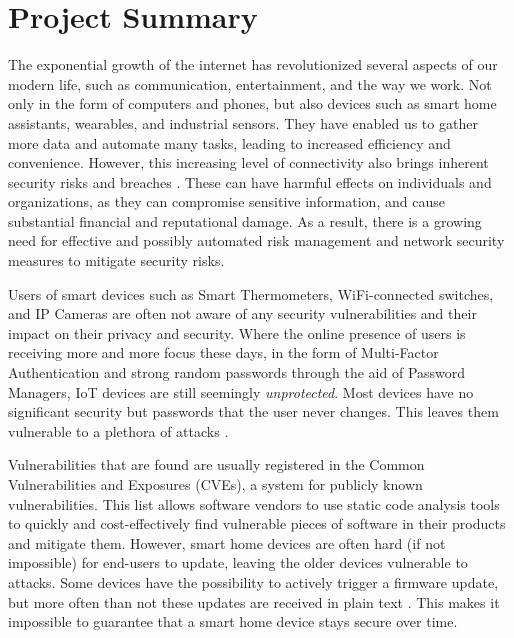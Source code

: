 \section{Project Summary}\label{sec:project-summary}

The exponential growth of the internet has revolutionized several aspects of our modern life, such as communication, entertainment, and the way we work. Not only in the form of computers and phones, but also devices such as smart home assistants, wearables, and industrial sensors. They have enabled us to gather more data and automate many tasks, leading to increased efficiency and convenience. However, this increasing level of connectivity also brings inherent security risks and breaches \cite{khandelwal2016friday, wei2018casino}. These can have harmful effects on individuals and organizations, as they can compromise sensitive information, and cause substantial financial and reputational damage. As a result, there is a growing need for effective and possibly automated risk management and network security measures to mitigate security risks.

Users of smart devices such as Smart Thermometers, WiFi-connected switches, and IP Cameras are often not aware of any security vulnerabilities and their impact on their privacy and security. Where the online presence of users is receiving more and more focus these days, in the form of Multi-Factor Authentication and strong random passwords through the aid of Password Managers, IoT devices are still seemingly \emph{unprotected}. Most devices have no significant security but passwords that the user never changes. This leaves them vulnerable to a plethora of attacks \cite{hamza2019detecting, paudel2019detecting}. 

Vulnerabilities that are found are usually registered in the Common Vulnerabilities and Exposures (CVEs), a system for publicly known vulnerabilities. This list allows software vendors to use static code analysis tools to quickly and cost-effectively find vulnerable pieces of software in their products and mitigate them. However, smart home devices are often hard (if not impossible) for end-users to update, leaving the older devices vulnerable to attacks. Some devices have the possibility to actively trigger a firmware update, but more often than not these updates are received in plain text \cite{wurm2016security}. This makes it impossible to guarantee that a smart home device stays secure over time.

